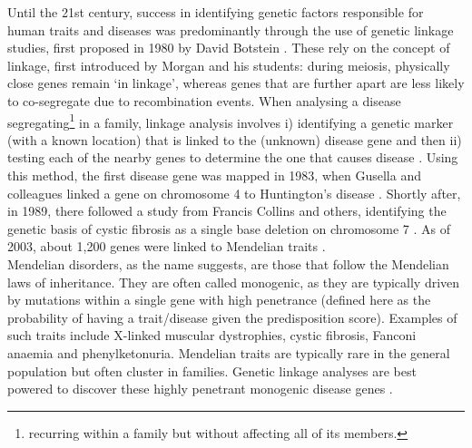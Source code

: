 Until the 21st century, success in identifying genetic factors responsible for human traits and diseases was predominantly 
through the use of genetic linkage studies, first proposed in 1980 by David Botstein \cite{botstein1980construction}.
These rely on the concept of linkage, first introduced by Morgan and his students: during meiosis, physically close genes remain `in linkage', whereas genes that are further apart are less likely to co-segregate due to recombination events.
When analysing a disease segregating\footnote{recurring within a family but without affecting all of its members.} in a family, linkage analysis
involves i) identifying a genetic marker (with a known location) that is linked to the (unknown) disease gene and then ii) testing each of the nearby genes to determine the one that causes disease \cite{teare2005genetic}. 
Using this method, the first disease gene was mapped in 1983, when Gusella and colleagues linked a gene on chromosome 4 to Huntington's disease \cite{gusella1983polymorphic}.
Shortly after, in 1989, there followed a study from Francis Collins and others, identifying the genetic basis of cystic fibrosis as a single base deletion on chromosome 7 \cite{riordan1989identification}.
As of 2003, about 1,200 genes were linked to Mendelian traits \cite{botstein2003discovering}.\\

Mendelian disorders, as the name suggests, are those that follow the Mendelian laws of inheritance.
They are often called monogenic, as they are typically driven by mutations within a single gene with high penetrance (defined here as the probability of having a trait/disease given the predisposition score). 
Examples of such traits include X-linked muscular dystrophies, cystic fibrosis, Fanconi anaemia and phenylketonuria. 
Mendelian traits are typically rare 
in the general population but often cluster in families.
Genetic linkage analyses are best powered to discover these highly penetrant monogenic disease genes \cite{cardon2001association}.\\

